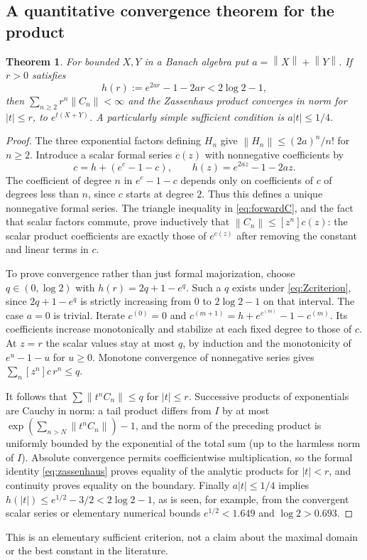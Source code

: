 \documentclass[11pt]{article}
\numberwithin{equation}{section}
\newtheorem{theorem}{Theorem}[section]
\theoremstyle{definition}
\theoremstyle{remark}
\newcommand{\norm}[1]{\left\lVert#1\right\rVert}
\begin{document}
\subsection{A quantitative convergence theorem for the product}
\begin{theorem}\label{thm:Zconv}
For bounded $X,Y$ in a Banach algebra put
$a=\norm{X}+\norm{Y}$. If $r>0$ satisfies
\begin{equation}\label{eq:Zcriterion}
 h(r):=e^{2ar}-1-2ar<2\log2-1,
\end{equation}
then $\sum_{n\geq2}r^n\norm{C_n}<\infty$ and the Zassenhaus product
converges in norm for $|t|\leq r$, to $e^{t(X+Y)}$.
A particularly simple sufficient condition is $a|t|\leq1/4$.
\end{theorem}
\begin{proof}
The three exponential factors defining $H_n$ give
$\norm{H_n}\leq(2a)^n/n!$ for $n\geq2$.
Introduce a scalar formal series $c(z)$ with nonnegative
coefficients by
\begin{equation}\label{eq:majorantimplicit}
 c=h+(e^c-1-c),\qquad h(z)=e^{2az}-1-2az.
\end{equation}
The coefficient of degree $n$ in $e^c-1-c$ depends only on
coefficients of $c$ of degrees less than $n$, since $c$ starts at
degree $2$. Thus this defines a unique nonnegative formal series.
The triangle inequality in \eqref{eq:forwardC}, and the fact that
scalar factors commute, prove inductively that
$\norm{C_n}\leq[z^n]c(z)$: the scalar product coefficients are
exactly those of $e^{c(z)}$ after removing the constant and linear
terms in $c$.

To prove convergence rather than just formal majorization, choose
$q\in(0,\log2)$ with $h(r)=2q+1-e^q$. Such a $q$ exists under
\eqref{eq:Zcriterion}, since $2q+1-e^q$ is strictly increasing
from $0$ to $2\log2-1$ on that interval. The case $a=0$ is
trivial. Iterate $c^{(0)}=0$ and
$c^{(m+1)}=h+e^{c^{(m)}}-1-c^{(m)}$. Its coefficients increase
monotonically and stabilize at each fixed degree to those of $c$.
At $z=r$ the scalar values stay at most $q$, by induction and the
monotonicity of $e^u-1-u$ for $u\geq0$. Monotone convergence of
nonnegative series gives $\sum_n[z^n]c\,r^n\leq q$.

It follows that $\sum\norm{t^nC_n}\leq q$ for $|t|\leq r$.
Successive products of exponentials are Cauchy in norm: a tail
product differs from $I$ by at most
$\exp(\sum_{n>N}\norm{t^nC_n})-1$, and the norm of the preceding
product is uniformly bounded by the exponential of the total sum
(up to the harmless norm of $I$). Absolute convergence permits
coefficientwise multiplication, so the formal identity
\eqref{eq:zassenhaus} proves equality of the analytic products for
$|t|<r$, and continuity proves equality on the boundary.
Finally $a|t|\leq1/4$ implies
$h(|t|)\leq e^{1/2}-3/2<2\log2-1$, as is seen, for example,
from the convergent scalar series or elementary numerical bounds
$e^{1/2}<1.649$ and $\log2>0.693$.
\end{proof}
This is an elementary sufficient criterion, not a claim about the
maximal domain or the best constant in the literature.
\end{document}
